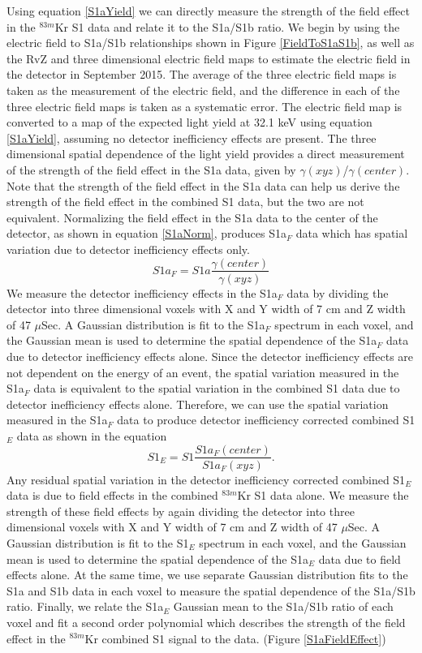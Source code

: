 Using equation \ref{S1aYield} we can directly measure the strength of the field effect in the $^{83m}$Kr S1 data and relate it to the S1a/S1b ratio.  We begin by using the electric field to S1a/S1b relationships shown in Figure \ref{FieldToS1aS1b}, as well as the RvZ and three dimensional electric field maps to estimate the electric field in the detector in September 2015.  The average of the three electric field maps is taken as the measurement of the electric field, and the difference in each of the three electric field maps is taken as a systematic error.  The electric field map is converted to a map of the expected light yield at 32.1 keV using equation \ref{S1aYield}, assuming no detector inefficiency effects are present. The three dimensional spatial dependence of the light yield provides a direct measurement of the strength of the field effect in the S1a data, given by $\gamma(xyz)$/$\gamma(center)$.  Note that the strength of the field effect in the S1a data can help us derive the strength of the field effect in the combined S1 data, but the two are not equivalent.  Normalizing the field effect in the S1a data to the center of the detector, as shown in equation \ref{S1aNorm}, produces S1a$_F$ data which has spatial variation due to detector inefficiency effects only.  
\begin{equation}
S1a_F = S1a \frac{\gamma(center)}{\gamma(xyz)}
\label{S1aNorm}
\end{equation}
We measure the detector inefficiency effects in the S1a$_F$ data by dividing the detector into three dimensional voxels with X and Y width of 7 cm and Z width of 47 $\mu$Sec.  A Gaussian distribution is fit to the S1a$_F$ spectrum in each voxel, and the Gaussian mean is used to determine the spatial dependence of the S1a$_F$ data due to detector inefficiency effects alone.  Since the detector inefficiency effects are not dependent on the energy of an event, the spatial variation measured in the S1a$_F$ data is equivalent to the spatial variation in the combined S1 data due to detector inefficiency effects alone.  Therefore, we can use the spatial variation measured in the S1a$_F$ data to produce detector inefficiency corrected combined S1$_E$ data as shown in the equation
\begin{equation}
S1_E= S1 \frac{S1a_F(center)}{S1a_F(xyz)}.
\end{equation}
Any residual spatial variation in the detector inefficiency corrected combined S1$_E$ data is due to field effects in the combined $^{83m}$Kr S1 data alone.  We measure the strength of these field effects by again dividing the detector into three dimensional voxels with X and Y width of 7 cm and Z width of 47 $\mu$Sec.  A Gaussian distribution is fit to the S1$_E$ spectrum in each voxel, and the Gaussian mean is used to determine the spatial dependence of the S1a$_E$ data due to field effects alone.  At the same time, we use separate Gaussian distribution fits to the S1a and S1b data in each voxel to measure the spatial dependence of the S1a/S1b ratio.  Finally, we relate the S1a$_E$ Gaussian mean to the S1a/S1b ratio of each voxel and fit a second order polynomial which describes the strength of the field effect in the $^{83m}$Kr combined S1 signal to the data. (Figure \ref{S1aFieldEffect}) 


